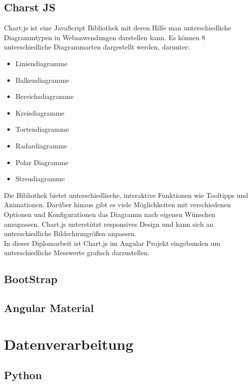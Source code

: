 \documentclass{report}
\begin{document}
\subsection{Charst JS}
\text
Chart.js ist eine JavaScript Bibliothek mit deren Hilfe man unterschiedliche Diagrammtypen in Webanwendungen darstellen kann. 
Es können 8 unterschiedliche Diagrammarten dargestellt werden, darunter: 
\begin{itemize}
    \item Liniendiagramme
    \item Balkendiagramme
    \item Bereichsdiagramme
    \item Kreisdiagramme
    \item Tortendiagramme
    \item Radardiagramme
    \item Polar Diagramme
    \item Streudiagramme
\end{itemize}
Die Bibliothek bietet unterschiedlieche, interaktive Funktionen wie Tooltipps und Animationen. 
Darüber hinaus gibt es viele Möglichkeiten mit verschiedenen Optionen und Konfigurationen das Diagramm nach eigenen Wünschen  anzupassen. 
Chart.js unterstützt responsives Design und kann sich an unterschiedliche Bildschirmgrößen anpassen.\\In dieser Diplomarbeit ist Chart.js im Angular Projekt eingebunden um unterschiedliche Messwerte grafisch darzustellen.
\subsection{BootStrap}
\subsection{Angular Material}

\section{Datenverarbeitung}
\subsection{Python}
\end{document}
